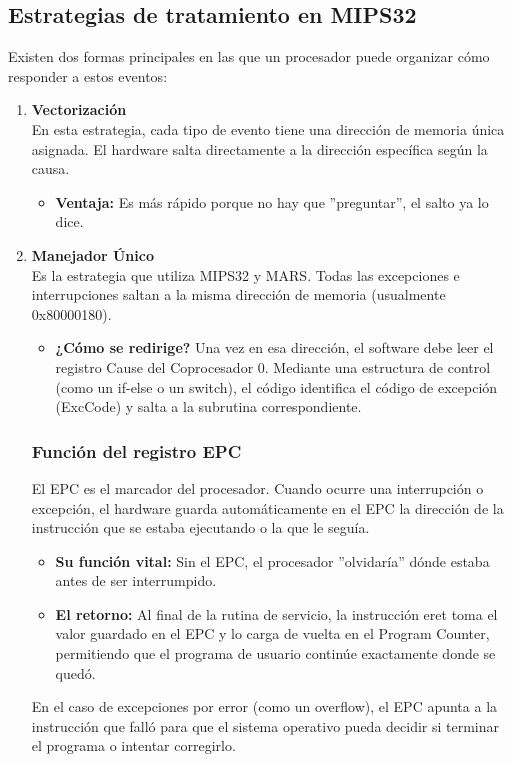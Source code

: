 \documentclass[]{article}
\begin{document}
	\subsection{Estrategias de tratamiento en MIPS32}
		Existen dos formas principales en las que un procesador puede organizar cómo responder a estos eventos:
		\begin{enumerate}
			\item \textbf{Vectorización}\\
				En esta estrategia, cada tipo de evento tiene una dirección de memoria única asignada. El hardware salta directamente a la dirección específica según la causa.
				\begin{itemize}
					\item \textbf{Ventaja:} Es más rápido porque no hay que ''preguntar'', el salto ya lo dice.
				\end{itemize}
			\item \textbf{Manejador Único}\\
				Es la estrategia que utiliza MIPS32 y MARS. Todas las excepciones e interrupciones saltan a la misma dirección de memoria (usualmente 0x80000180).
				\begin{itemize}
					\item \textbf{¿Cómo se redirige?} Una vez en esa dirección, el software debe leer el registro Cause del Coprocesador 0. Mediante una estructura de control (como un if-else o un switch), el código identifica el código de excepción (ExcCode) y salta a la subrutina correspondiente.
				\end{itemize}
		\subsubsection{Función del registro EPC}
			El EPC es el marcador del procesador. Cuando ocurre una interrupción o excepción, el hardware guarda automáticamente en el EPC la dirección de la instrucción que se estaba ejecutando o la que le seguía.
			\begin{itemize}
				\item \textbf{Su función vital:} Sin el EPC, el procesador ''olvidaría'' dónde estaba antes de ser interrumpido.
				\item \textbf{El retorno:} Al final de la rutina de servicio, la instrucción eret toma el valor guardado en el EPC y lo carga de vuelta en el Program Counter, permitiendo que el programa de usuario continúe exactamente donde se quedó.
			\end{itemize}
			En el caso de excepciones por error (como un overflow), el EPC apunta a la instrucción que falló para que el sistema operativo pueda decidir si terminar el programa o intentar corregirlo.
		
		\end{enumerate}
		
\end{document}
